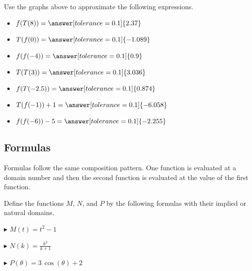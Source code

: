 \documentclass{ximera}
\begin{document}
\begin{question}


Use the graphs above to approximate the following expressions.



\begin{itemize}

\item $f(T(8)) = \answer[tolerance=0.1]{2.37}$ 

\item $T(f(0)) = \answer[tolerance=0.1]{-1.089}$ 

\item $f(f(-4)) = \answer[tolerance=0.1]{0.9}$ 

\item $T(T(3)) = \answer[tolerance=0.1]{3.036}$ 

\item $f(T(-2.5)) = \answer[tolerance=0.1]{0.874}$ 

\item $T(f(-1))+1 = \answer[tolerance=0.1]{-6.058}$ 

\item $f(f(-6)) -5 = \answer[tolerance=0.1]{-2.255}$ 

\end{itemize}



\end{question}

















\subsection*{Formulas}


Formulas follow the same composition pattern. One function is evaluated at a domain number and then the second function is evaluated at the value of the first function.


Define the functions $M$, $N$, and $P$ by the following formulas with their implied or natural domains.

$\blacktriangleright$  $M(t) = t^2 - 1$ 

$\blacktriangleright$ $N(k) = \frac{k^2}{k + 1}$ 

$\blacktriangleright$ $P(\theta) = 3 \, \cos(\theta) + 2$
\end{document}
